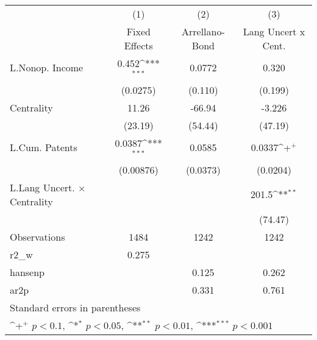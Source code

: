{
\def\sym#1{\ifmmode^{#1}\else\(^{#1}\)\fi}
\begin{tabular}{l*{3}{c}}
\hline\hline
                    &\multicolumn{1}{c}{(1)}&\multicolumn{1}{c}{(2)}&\multicolumn{1}{c}{(3)}\\
                    &\multicolumn{1}{c}{Fixed Effects}&\multicolumn{1}{c}{Arrellano-Bond}&\multicolumn{1}{c}{Lang Uncert x Cent.}\\
\hline
L.Nonop. Income     &       0.452\sym{***}&      0.0772         &       0.320         \\
                    &    (0.0275)         &     (0.110)         &     (0.199)         \\
Centrality          &       11.26         &      -66.94         &      -3.226         \\
                    &     (23.19)         &     (54.44)         &     (47.19)         \\
L.Cum. Patents      &      0.0387\sym{***}&      0.0585         &      0.0337\sym{+}  \\
                    &   (0.00876)         &    (0.0373)         &    (0.0204)         \\
L.Lang Uncert. $\times$ Centrality&                     &                     &       201.5\sym{**} \\
                    &                     &                     &     (74.47)         \\
\hline
Observations        &        1484         &        1242         &        1242         \\
r2\_w                &       0.275         &                     &                     \\
hansenp             &                     &       0.125         &       0.262         \\
ar2p                &                     &       0.331         &       0.761         \\
\hline\hline
\multicolumn{4}{l}{\footnotesize Standard errors in parentheses}\\
\multicolumn{4}{l}{\footnotesize \sym{+} \(p<0.1\), \sym{*} \(p<0.05\), \sym{**} \(p<0.01\), \sym{***} \(p<0.001\)}\\
\end{tabular}
}
